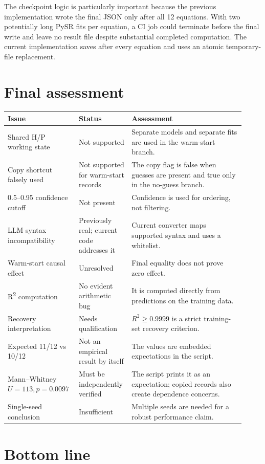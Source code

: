 \documentclass[11pt]{article}
\begin{document}
The checkpoint logic is particularly important because the previous implementation wrote the final JSON only after all 12 equations. With two potentially long PySR fits per equation, a CI job could terminate before the final write and leave no result file despite substantial completed computation. The current implementation saves after every equation and uses an atomic temporary-file replacement.

\section{Final assessment}

\begin{longtable}{p{0.28\linewidth}p{0.18\linewidth}p{0.46\linewidth}}
\toprule
Issue & Status & Assessment \\
\midrule
Shared H/P working state & Not supported & Separate models and separate fits are used in the warm-start branch. \\
Copy shortcut falsely used & Not supported for warm-start records & The copy flag is false when guesses are present and true only in the no-guess branch. \\
0.5--0.95 confidence cutoff & Not present & Confidence is used for ordering, not filtering. \\
LLM syntax incompatibility & Previously real; current code addresses it & Current converter maps supported syntax and uses a whitelist. \\
Warm-start causal effect & Unresolved & Final equality does not prove zero effect. \\
R\textsuperscript{2} computation & No evident arithmetic bug & It is computed directly from predictions on the training data. \\
Recovery interpretation & Needs qualification & \(R^2\ge0.9999\) is a strict training-set recovery criterion. \\
Expected 11/12 vs 10/12 & Not an empirical result by itself & The values are embedded expectations in the script. \\
Mann--Whitney \(U=113,p=0.0097\) & Must be independently verified & The script prints it as an expectation; copied records also create dependence concerns. \\
Single-seed conclusion & Insufficient & Multiple seeds are needed for a robust performance claim. \\
\bottomrule
\end{longtable}

\section{Bottom line}
\end{document}
